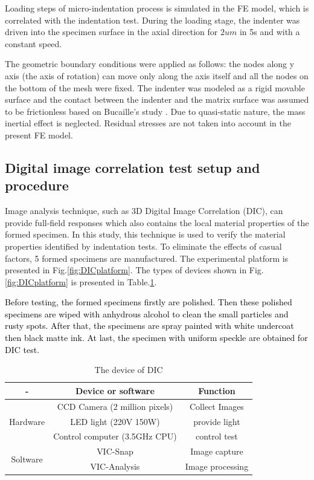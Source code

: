 \documentclass[review]{elsarticle}
\begin{document}
Loading steps of micro-indentation process is simulated in the FE model, which is correlated with the indentation test. During the loading stage, the indenter was driven into the specimen surface in the axial direction for $2um$ in 5s and with a constant speed.

The geometric boundary conditions were applied as follows: the nodes along y axis (the axis of rotation) can move only along the axis itself and all the nodes on the bottom of the mesh were fixed. The indenter was modeled as a rigid movable surface and the contact between the indenter and the matrix surface was assumed to be frictionless based on Bucaille's study \cite{bucaille2003determination}. Due to quasi-static nature, the mass inertial effect is neglected. Residual stresses are not taken into account in the present FE model.

\subsection{Digital image correlation test setup and procedure}

Image analysis technique, such as 3D Digital Image Correlation (DIC), can provide full-field responses which also contains the local material properties of the formed specimen. In this study, this technique is used to verify the material properties identified by indentation tests. To eliminate the effects of casual factors, 5 formed specimens are manufactured. The experimental platform is presented in Fig.\ref{fig:DICplatform}. The types of devices shown in Fig.\ref{fig:DICplatform} is presented in Table.\ref{table:DIC}.

\textcolor{black}{Before testing, the formed specimens firstly are polished. Then these polished specimens are wiped with anhydrous alcohol to clean the small particles and rusty spots. After that, the specimens are spray painted with white undercoat then black matte ink. At last, the specimen with uniform speckle are obtained for DIC test.}

\begin{table}[h!]
\centering
\caption{The device of DIC}
\begin{tabular}{c c c} 
 \hline
 - & Device or software & Function\\
 \hline
 \multirow{3}{4em}{Hardware} &  CCD Camera (2 million pixels) & Collect Images\\ 
& LED light (220V 150W) & provide light  \\
& Control computer (3.5GHz CPU) & control test \\
\multirow{2}{4em}{Soltware} & VIC-Snap & Image capture \\
& VIC-Analysis & Image processing \\
 \hline
\end{tabular}
\label{table:DIC}
\end{table}
\end{document}
